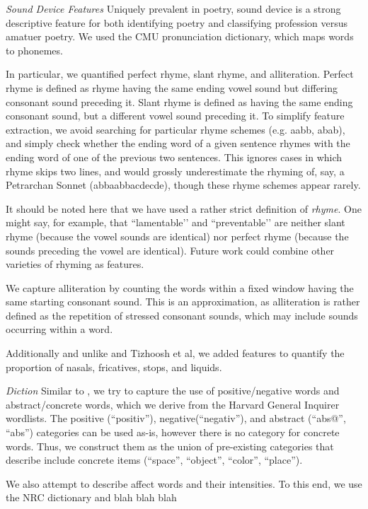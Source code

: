 \documentclass[11pt]{article}
\begin{document}
\emph{Sound Device Features}
Uniquely prevalent in poetry, sound device is a strong descriptive feature for both identifying poetry\cite{tizhoosh2008poetic} and classifying profession versus amatuer poetry\cite{kao2012computational}. We used the CMU pronunciation dictionary, which maps words to phonemes.

In particular, we quantified perfect rhyme, slant rhyme, and alliteration. Perfect rhyme is defined as rhyme having the same ending vowel sound but differing consonant sound preceding it. Slant rhyme is defined as having the same ending consonant sound, but a different vowel sound preceding it. To simplify feature extraction, we avoid searching for particular rhyme schemes (e.g. aabb, abab), and simply check whether the ending word of a given sentence rhymes with the ending word of one of the previous two sentences. This ignores cases in which rhyme skips two lines, and would grossly underestimate the rhyming of, say, a Petrarchan Sonnet (abbaabbacdecde), though these rhyme schemes appear rarely.

It should be noted here that we have used a rather strict definition of \emph{rhyme}. One might say, for example, that ``lamentable’’ and ``preventable’’ are neither slant rhyme (because the vowel sounds are identical) nor perfect rhyme (because the sounds preceding the vowel are identical). Future work could combine other varieties of rhyming as features.

We capture alliteration by counting the words within a fixed window having the same starting consonant sound. This is an approximation, as alliteration is rather defined as the repetition of stressed consonant sounds, which may include sounds occurring within a word.

Additionally and unlike \cite{kao2012computational} and Tizhoosh et al, we added features to quantify the proportion of nasals, fricatives, stops, and liquids. 

\emph{Diction}
Similar to \cite{kao2012computational}, we try to capture the use of positive/negative words and abstract/concrete words, which we derive from the Harvard General Inquirer wordlists. The positive (``positiv''), negative(``negativ''), and abstract (``abs@'', ``abs'') categories can be used as-is, however there is no category for concrete words. Thus, we construct them as the union of pre-existing categories that describe include concrete items (``space'', ``object'', ``color'', ``place'').

We also attempt to describe affect words and their intensities. To this end, we use the NRC dictionary and blah blah blah
\end{document}
